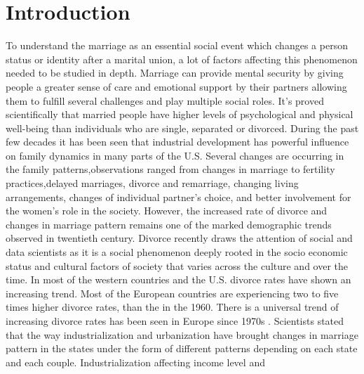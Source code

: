 \documentclass[10pt,twocolumn]{article}
\begin{document}
\section{Introduction}
To understand the marriage as an essential social event which changes a person status or identity after a marital union, a lot of factors affecting this phenomenon needed to be studied in depth. Marriage can provide mental security by giving people a greater sense of care and emotional support by their partners allowing them to fulfill several challenges and play multiple social roles\cite{berkman2000social}. It's proved scientifically that married people have higher levels of psychological and physical well-being than individuals who are single, separated or divorced\cite{overbeek2006longitudinal}. During the past few decades it has been seen that industrial development has powerful influence on family dynamics in many parts of the U.S. Several changes are occurring in the family patterns,observations ranged from changes in marriage to fertility practices,delayed marriages, divorce and remarriage, changing living
arrangements, changes of individual partner's choice, and better involvement for the women's role in the society. However, the increased rate of divorce and changes in marriage pattern remains one of the marked demographic trends observed in twentieth century\cite{grundy2005reciprocity}. Divorce recently draws the attention of social and data scientists as it is a social phenomenon deeply rooted in the socio economic status and cultural factors of society that varies across the culture and over the time. In most of the western countries and the U.S. divorce rates have shown an increasing trend\cite{cherlin2010demographic}. Most of the European countries are experiencing two to five times higher divorce rates, than the in the 1960. There is a universal trend of increasing divorce rates has been seen in Europe since 1970s \cite{billari2010towards}. Scientists stated that the way industrialization and urbanization have brought changes in marriage pattern in the states under the form of different patterns depending on each state and each couple.
Industrialization affecting income level and
\end{document}
